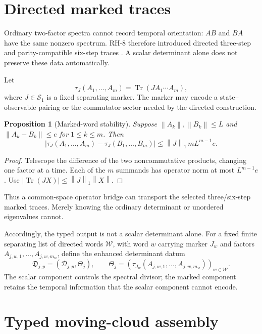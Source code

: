 \documentclass[11pt]{article}
\newtheorem{proposition}[theorem]{Proposition}
\theoremstyle{definition}
\theoremstyle{remark}
\newcommand{\cD}{\mathcal D}
\newcommand{\Tr}{\operatorname{Tr}}
\newcommand{\norm}[1]{\left\lVert#1\right\rVert}
\begin{document}
\section{Directed marked traces}

Ordinary two-factor spectra cannot record temporal orientation: $AB$ and
$BA$ have the same nonzero spectrum.  RH-8 therefore introduced directed
three-step and parity-compatible six-step traces \citep{WangRH8}.  A scalar
determinant alone does not preserve these data automatically.

Let
\[
 \tau_J(A_1,\ldots,A_m)=\Tr(JA_1\cdots A_m),
\]
where $J\in\mathcal S_1$ is a fixed separating marker.  The marker may encode
a state--observable pairing or the commutator sector needed by the directed
construction.

\begin{proposition}[Marked-word stability]\label{prop:marked}
Suppose $\norm{A_k},\norm{B_k}\leq L$ and
$\norm{A_k-B_k}\leq e$ for $1\leq k\leq m$.  Then
\begin{equation}\label{eq:marked-bound}
 |\tau_J(A_1,\ldots,A_m)-\tau_J(B_1,\ldots,B_m)|
 \leq \norm J_1\,mL^{m-1}e.
\end{equation}
\end{proposition}
\begin{proof}
Telescope the difference of the two noncommutative products, changing one
factor at a time.  Each of the $m$ summands has operator norm at most
$L^{m-1}e$.  Use $|\Tr(JX)|\leq\norm J_1\norm X$.
\end{proof}

Thus a common-space operator bridge can transport the selected three/six-step
marked traces.  Merely knowing the ordinary determinant or unordered
eigenvalues cannot.

Accordingly, the typed output is not a scalar determinant alone.  For a
fixed finite separating list of directed words $\mathcal W$, with word $w$
carrying marker $J_w$ and factors
$A_{j,w,1},\ldots,A_{j,w,m_w}$, define the enhanced determinant datum
\[
 \mathfrak D_{j,p}=(\cD_{j,p},\Theta_j),
 \qquad
 \Theta_j=\left(
 \tau_{J_w}(A_{j,w,1},\ldots,A_{j,w,m_w})
 \right)_{w\in\mathcal W}.
\]
The scalar component controls the spectral divisor; the marked component
retains the temporal information that the scalar component cannot encode.

\section{Typed moving-cloud assembly}
\end{document}
